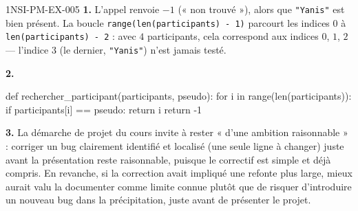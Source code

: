 \begin{corrige}{1NSI-PM-EX-005}
\textbf{1.} L'appel renvoie $-1$ (« non trouvé »), alors que \lstinline{"Yanis"} est bien
présent. La boucle \lstinline{range(len(participants) - 1)} parcourt les indices $0$ à
\lstinline{len(participants) - 2} : avec $4$ participants, cela correspond aux indices $0$,
$1$, $2$ — l'indice $3$ (le dernier, \lstinline{"Yanis"}) n'est jamais testé.

\textbf{2.}
\begin{python}
def rechercher_participant(participants, pseudo):
    for i in range(len(participants)):
        if participants[i] == pseudo:
            return i
    return -1
\end{python}

\textbf{3.} La démarche de projet du cours invite à rester « d'une ambition raisonnable » :
corriger un bug clairement identifié et localisé (une seule ligne à changer) juste avant la
présentation reste raisonnable, puisque le correctif est simple et déjà compris. En
revanche, si la correction avait impliqué une refonte plus large, mieux aurait valu la
documenter comme limite connue plutôt que de risquer d'introduire un nouveau bug dans la
précipitation, juste avant de présenter le projet.
\end{corrige}
